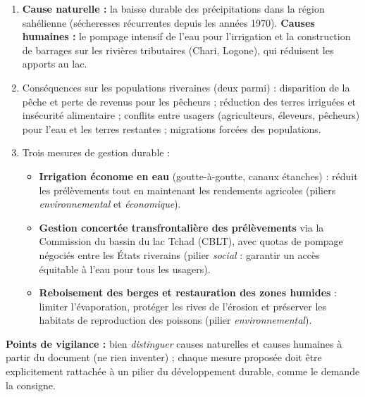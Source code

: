 \documentclass[11pt]{article}
\begin{document}
\begin{corrige}
\begin{enumerate}
\item \textbf{Cause naturelle :} la baisse durable des précipitations dans la région sahélienne (sécheresses récurrentes depuis les années 1970). \textbf{Causes humaines :} le pompage intensif de l'eau pour l'irrigation et la construction de barrages sur les rivières tributaires (Chari, Logone), qui réduisent les apports au lac.
\item Conséquences sur les populations riveraines (deux parmi) : disparition de la pêche et perte de revenus pour les pêcheurs ; réduction des terres irriguées et insécurité alimentaire ; conflits entre usagers (agriculteurs, éleveurs, pêcheurs) pour l'eau et les terres restantes ; migrations forcées des populations.
\item Trois mesures de gestion durable :
\begin{itemize}
\item \textbf{Irrigation économe en eau} (goutte-à-goutte, canaux étanches) : réduit les prélèvements tout en maintenant les rendements agricoles (piliers \emph{environnemental} et \emph{économique}).
\item \textbf{Gestion concertée transfrontalière des prélèvements} via la Commission du bassin du lac Tchad (CBLT), avec quotas de pompage négociés entre les États riverains (pilier \emph{social} : garantir un accès équitable à l'eau pour tous les usagers).
\item \textbf{Reboisement des berges et restauration des zones humides} : limiter l'évaporation, protéger les rives de l'érosion et préserver les habitats de reproduction des poissons (pilier \emph{environnemental}).
\end{itemize}
\end{enumerate}
\textbf{Points de vigilance :} bien \emph{distinguer} causes naturelles et causes humaines à partir du document (ne rien inventer) ; chaque mesure proposée doit être explicitement rattachée à un pilier du développement durable, comme le demande la consigne.
\end{corrige}
\end{document}
